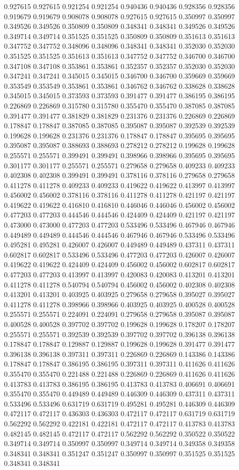 0.927615 0.927615 0.921254 0.921254 0.940436 0.940436 0.928356 0.928356 0.919679 0.919679 0.908078 0.908078 0.927615 0.927615 0.350997 0.350997 0.349526 0.349526 0.350809 0.350809 0.348341 0.348341 0.349526 0.349526 0.349714 0.349714 0.351525 0.351525 0.350809 0.350809 0.351613 0.351613 0.347752 0.347752 0.348096 0.348096 0.348341 0.348341 0.352030 0.352030 0.351525 0.351525 0.351613 0.351613 0.347752 0.347752 0.346700 0.346700 0.347108 0.347108 0.353861 0.353861 0.352357 0.352357 0.352030 0.352030 0.347241 0.347241 0.345015 0.345015 0.346700 0.346700 0.359669 0.359669 0.353549 0.353549 0.353861 0.353861 0.346762 0.346762 0.338628 0.338628 0.345015 0.345015 0.373593 0.373593 0.391477 0.391477 0.386195 0.386195 0.226869 0.226869 0.315780 0.315780 0.355470 0.355470 0.387085 0.387085 0.391477 0.391477 0.381829 0.381829 0.231376 0.231376 0.226869 0.226869 0.178847 0.178847 0.387085 0.387085 0.395087 0.395087 0.392539 0.392539 0.199628 0.199628 0.231376 0.231376 0.178847 0.178847 0.395695 0.395695 0.395087 0.395087 0.388693 0.388693 0.278212 0.278212 0.199628 0.199628 0.255571 0.255571 0.399491 0.399491 0.398966 0.398966 0.395695 0.395695 0.301177 0.301177 0.255571 0.255571 0.279658 0.279658 0.409233 0.409233 0.402308 0.402308 0.399491 0.399491 0.378116 0.378116 0.279658 0.279658 0.411278 0.411278 0.409233 0.409233 0.419622 0.419622 0.413997 0.413997 0.456002 0.456002 0.378116 0.378116 0.411278 0.411278 0.421197 0.421197 0.419622 0.419622 0.416810 0.416810 0.446046 0.446046 0.456002 0.456002 0.477203 0.477203 0.444546 0.444546 0.424409 0.424409 0.421197 0.421197 0.473000 0.473000 0.477203 0.477203 0.533496 0.533496 0.467946 0.467946 0.449489 0.449489 0.444546 0.444546 0.467946 0.467946 0.533496 0.533496 0.495281 0.495281 0.426007 0.426007 0.449489 0.449489 0.437311 0.437311 0.602817 0.602817 0.533496 0.533496 0.477203 0.477203 0.426007 0.426007 0.419622 0.419622 0.424409 0.424409 0.456002 0.456002 0.602817 0.602817 0.477203 0.477203 0.413997 0.413997 0.420083 0.420083 0.413201 0.413201 0.411278 0.411278 0.540794 0.540794 0.456002 0.456002 0.402308 0.402308 0.413201 0.413201 0.403925 0.403925 0.279658 0.279658 0.395027 0.395027 0.411278 0.411278 0.398966 0.398966 0.403925 0.403925 0.400528 0.400528 0.255571 0.255571 0.224091 0.224091 0.279658 0.279658 0.395087 0.395087 0.400528 0.400528 0.397702 0.397702 0.199628 0.199628 0.178207 0.178207 0.255571 0.255571 0.392539 0.392539 0.397702 0.397702 0.396138 0.396138 0.178847 0.178847 0.129887 0.129887 0.199628 0.199628 0.391477 0.391477 0.396138 0.396138 0.397311 0.397311 0.226869 0.226869 0.143386 0.143386 0.178847 0.178847 0.386195 0.386195 0.397311 0.397311 0.411626 0.411626 0.355470 0.355470 0.221488 0.221488 0.226869 0.226869 0.411626 0.411626 0.413783 0.413783 0.386195 0.386195 0.413783 0.413783 0.406691 0.406691 0.355470 0.355470 0.449489 0.449489 0.446309 0.446309 0.437311 0.437311 0.533496 0.533496 0.631719 0.631719 0.495281 0.495281 0.446309 0.446309 0.472117 0.472117 0.436303 0.436303 0.472117 0.472117 0.631719 0.631719 0.562292 0.562292 0.422181 0.422181 0.472117 0.472117 0.413783 0.413783 0.482145 0.482145 0.472117 0.472117 0.562292 0.562292 0.350522 0.350522 0.349714 0.349714 0.350997 0.350997 0.349714 0.349714 0.349358 0.349358 0.348341 0.348341 0.351247 0.351247 0.350997 0.350997 0.351525 0.351525 0.348341 0.348341 